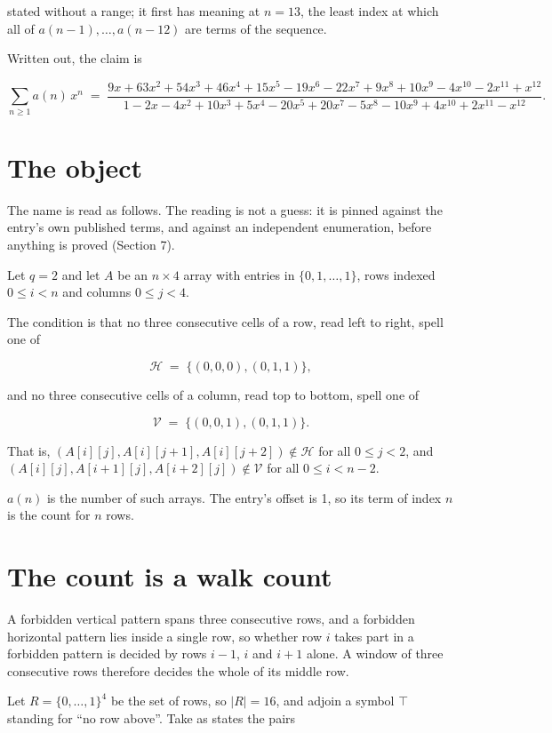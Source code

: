 \documentclass[11pt]{article}
\theoremstyle{definition}
\begin{document}
stated without a range; it first has meaning at $n = 13$, the least index at which all of $a(n-1),\dots,a(n-12)$ are terms of the sequence.

Written out, the claim is

\[\sum_{n \ge 1} a(n)\,x^n \;=\; \frac{9x + 63x^{2} + 54x^{3} + 46x^{4} + 15x^{5} - 19x^{6} - 22x^{7} + 9x^{8} + 10x^{9} - 4x^{10} - 2x^{11} + x^{12}}{1 - 2x - 4x^{2} + 10x^{3} + 5x^{4} - 20x^{5} + 20x^{7} - 5x^{8} - 10x^{9} + 4x^{10} + 2x^{11} - x^{12}}.\]

\section{The object}

The name is read as follows. The reading is not a guess: it is pinned against the entry's own published terms, and against an independent enumeration, before anything is proved (Section 7).

Let $q = 2$ and let $A$ be an $n \times 4$ array with entries in $\{0,1,\dots,1\}$, rows indexed $0 \le i < n$ and columns $0 \le j < 4$.

The condition is that no three consecutive cells of a row, read left to right, spell one of

\[\mathcal{H} \;=\; \{(0,0,0), (0,1,1)\},\]

and no three consecutive cells of a column, read top to bottom, spell one of

\[\mathcal{V} \;=\; \{(0,0,1), (0,1,1)\}.\]

That is, $(A[i][j],A[i][j{+}1],A[i][j{+}2]) \notin \mathcal{H}$ for all $0 \le j < 2$, and $(A[i][j],A[i{+}1][j],A[i{+}2][j]) \notin \mathcal{V}$ for all $0 \le i < n-2$.

$a(n)$ is the number of such arrays. The entry's offset is 1, so its term of index $n$ is the count for $n$ rows.

\section{The count is a walk count}

A forbidden vertical pattern spans three consecutive rows, and a forbidden horizontal pattern lies inside a single row, so whether row $i$ takes part in a forbidden pattern is decided by rows $i-1$, $i$ and $i+1$ alone. A window of three consecutive rows therefore decides the whole of its middle row.

Let $R = \{0,\dots,1\}^{4}$ be the set of rows, so $|R| = 16$, and adjoin a symbol $\top$ standing for ``no row above''. Take as states the pairs
\end{document}
